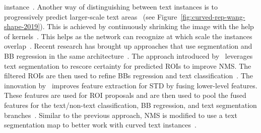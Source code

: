 instance~\citep{ferrari_textsnake_2018}.
Another way of distinguishing between text instances is to progressively predict larger-scale text
areas~\citep{wang_shape_2019} (see Figure~\ref{fig:curved-rep-wang-shape-2019}).
This is achieved by continuously shrinking the image with the help of
kernels~\citep{wang_shape_2019}.
This helps as the network can recognize at which scale the instances overlap~\citep{wang_shape_2019}.
Recent research has brought up approaches that use segmentation and \ac{BB} regression in the
same architecture~\citep{xie_scene_2018,dai_fused_2018}.
The approach introduced by~\cite{xie_scene_2018} leverages text segmentation to rescore certainty
for predicted \acp{ROI} to improve \ac{NMS}.
The filtered \acp{ROI} are then used to refine \acp{BB} regression and text
classification~\citep{xie_scene_2018}.
The innovation by~\cite{dai_fused_2018} improves feature extraction for \ac{STD} by fusing
lower-level features.
These features are used for \ac{ROI} proposals and are then used to pool the fused features for
the text/non-text classification, \ac{BB} regression, and text segmentation
branches~\citep{dai_fused_2018}.
Similar to the previous approach, \ac{NMS} is modified to use a text segmentation map to better
work with curved text instances~\citep{dai_fused_2018,xie_scene_2018}.

